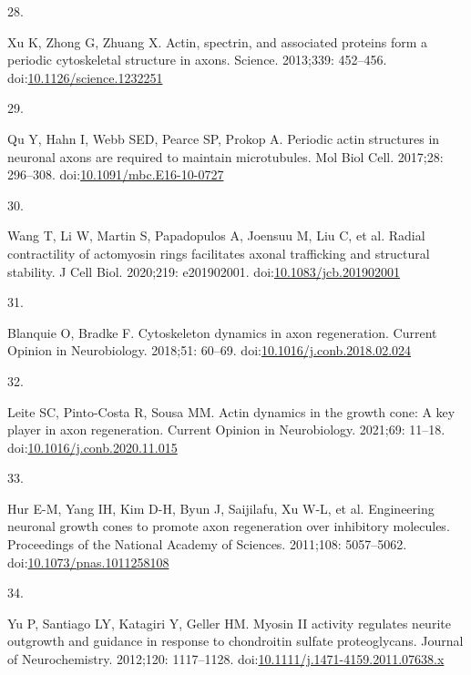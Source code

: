 \documentclass[
  12pt,
  a4paper,
]{book}
\newlength{\cslhangindent}
\newlength{\csllabelwidth}
\newenvironment{CSLReferences}[2] %
 {\begin{list}{}{%
  \setlength{\itemindent}{0pt}
  \setlength{\leftmargin}{0pt}
  \setlength{\parsep}{0pt}
  \ifodd #1
   \setlength{\leftmargin}{\cslhangindent}
   \setlength{\itemindent}{-1\cslhangindent}
  \fi
  \setlength{\itemsep}{#2\baselineskip}}}
 {\end{list}}
\newcommand{\CSLLeftMargin}[1]{\parbox[t]{\csllabelwidth}{\strut#1\strut}}
\newcommand{\CSLRightInline}[1]{\parbox[t]{\linewidth - \csllabelwidth}{\strut#1\strut}}
\begin{document}
\begin{CSLReferences}{0}{1}
\CSLLeftMargin{28. }%
\CSLRightInline{Xu K, Zhong G, Zhuang X. Actin, spectrin, and associated proteins form a periodic cytoskeletal structure in axons. Science. 2013;339: 452--456. doi:\href{https://doi.org/10.1126/science.1232251}{10.1126/science.1232251}}

\CSLLeftMargin{29. }%
\CSLRightInline{Qu Y, Hahn I, Webb SED, Pearce SP, Prokop A. Periodic actin structures in neuronal axons are required to maintain microtubules. Mol Biol Cell. 2017;28: 296--308. doi:\href{https://doi.org/10.1091/mbc.E16-10-0727}{10.1091/mbc.E16-10-0727}}

\CSLLeftMargin{30. }%
\CSLRightInline{Wang T, Li W, Martin S, Papadopulos A, Joensuu M, Liu C, et al. Radial contractility of actomyosin rings facilitates axonal trafficking and structural stability. J Cell Biol. 2020;219: e201902001. doi:\href{https://doi.org/10.1083/jcb.201902001}{10.1083/jcb.201902001}}

\CSLLeftMargin{31. }%
\CSLRightInline{Blanquie O, Bradke F. Cytoskeleton dynamics in axon regeneration. Current Opinion in Neurobiology. 2018;51: 60--69. doi:\href{https://doi.org/10.1016/j.conb.2018.02.024}{10.1016/j.conb.2018.02.024}}

\CSLLeftMargin{32. }%
\CSLRightInline{Leite SC, Pinto-Costa R, Sousa MM. Actin dynamics in the growth cone: A key player in axon regeneration. Current Opinion in Neurobiology. 2021;69: 11--18. doi:\href{https://doi.org/10.1016/j.conb.2020.11.015}{10.1016/j.conb.2020.11.015}}

\CSLLeftMargin{33. }%
\CSLRightInline{Hur E-M, Yang IH, Kim D-H, Byun J, Saijilafu, Xu W-L, et al. Engineering neuronal growth cones to promote axon regeneration over inhibitory molecules. Proceedings of the National Academy of Sciences. 2011;108: 5057--5062. doi:\href{https://doi.org/10.1073/pnas.1011258108}{10.1073/pnas.1011258108}}

\CSLLeftMargin{34. }%
\CSLRightInline{Yu P, Santiago LY, Katagiri Y, Geller HM. Myosin {II} activity regulates neurite outgrowth and guidance in response to chondroitin sulfate proteoglycans. Journal of Neurochemistry. 2012;120: 1117--1128. doi:\href{https://doi.org/10.1111/j.1471-4159.2011.07638.x}{10.1111/j.1471-4159.2011.07638.x}}


\end{CSLReferences}
\end{document}
